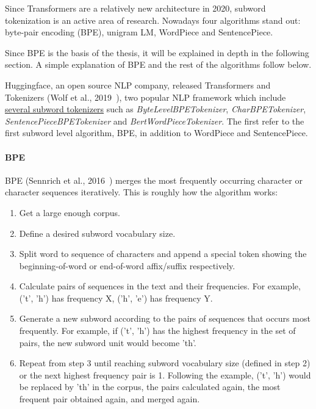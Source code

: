 Since Transformers are a relatively new architecture in 2020, subword tokenization is an active area of research. Nowadays four algorithms stand out: byte-pair encoding (BPE), unigram LM, WordPiece and SentencePiece.

Since BPE is the basis of the thesis, it will be explained in depth in the following section. A simple explanation of BPE and the rest of the algorithms follow below.

Huggingface, an open source NLP company, released Transformers and Tokenizers (Wolf et al., 2019~\cite{wolf2019huggingfaces}), two popular NLP framework which include \href{https://github.com/huggingface/tokenizers/tree/74d812d40180032d2dbb6ca59e2e10f0257ef46b/bindings/python/tokenizers/implementations}{several subword tokenizers} such as \emph{ByteLevelBPETokenizer}, \emph{CharBPETokenizer}, \emph{SentencePieceBPETokenizer} and \emph{BertWordPieceTokenizer}. The first refer to the first subword level algorithm, BPE, in addition to WordPiece and SentencePiece.

\paragraph{BPE}\label{subsubsec:bpe}

BPE (Sennrich et al., 2016~\cite{sennrich2015neural}) merges the most frequently occurring character or character sequences iteratively. This is roughly how the algorithm works:

\begin{enumerate}
    \item Get a large enough corpus.
    \item Define a desired subword vocabulary size.
    \item Split word to sequence of characters and append a special token showing the beginning-of-word or end-of-word affix/suffix respectively.
    \item Calculate pairs of sequences in the text and their frequencies. For example, ('t', 'h') has frequency X, ('h', 'e') has frequency Y.
    \item Generate a new subword according to the pairs of sequences that occurs most frequently. For example, if ('t', 'h') has the highest frequency in the set of pairs, the new subword unit would become 'th'.
    \item Repeat from step 3 until reaching subword vocabulary size (defined in step 2) or the next highest frequency pair is 1. Following the example, ('t', 'h') would be replaced by 'th' in the corpus, the pairs calculated again, the most frequent pair obtained again, and merged again.
\end{enumerate}

